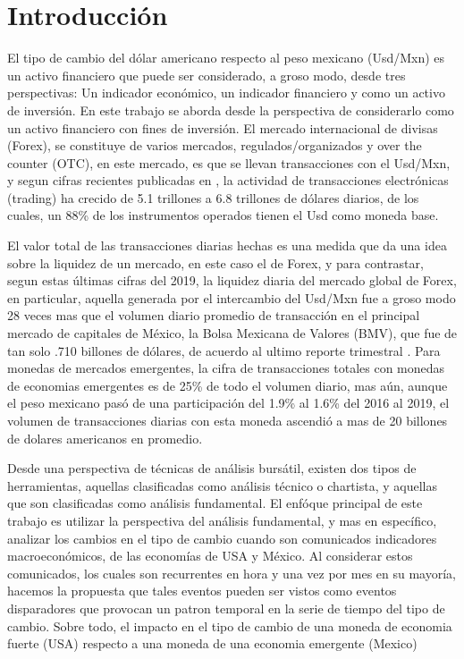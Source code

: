 \documentclass{article}\usepackage[]{graphicx}\usepackage[]{color}
\begin{document}
\section{Introducci\'on}
\label{sec_intro}

El tipo de cambio del d\'olar americano respecto al peso mexicano (Usd/Mxn) es un activo financiero que
puede ser considerado, a groso modo, desde tres perspectivas: Un indicador econ\'omico, un indicador
financiero y como un activo de inversi\'on. En este trabajo se aborda desde la perspectiva de considerarlo
como un activo financiero con fines de inversi\'on. El mercado internacional de divisas (Forex),
se constituye de varios mercados, regulados/organizados y over the counter (OTC), en este mercado, es que
se llevan transacciones con el Usd/Mxn, y segun cifras recientes publicadas en \cite{BIS2019}, la actividad
de transacciones electr\'onicas (trading) ha crecido de 5.1 trillones a 6.8 trillones de d\'olares diarios,
de los cuales, un 88\% de los instrumentos operados tienen el Usd como moneda base.

El valor total de las transacciones diarias hechas es una medida
que da una idea sobre la liquidez de un mercado, en este caso el de Forex, y para contrastar,
segun estas \'ultimas cifras del 2019, la liquidez diaria del mercado global de Forex, en particular,
aquella generada por el intercambio del Usd/Mxn fue a groso modo 28 veces mas que el volumen diario
promedio de transacci\'on en el principal mercado de capitales de M\'exico, la Bolsa Mexicana de Valores
(BMV), que fue de tan solo .710 billones de d\'olares, de acuerdo al ultimo reporte trimestral \cite{BMV2019}.
Para monedas de mercados emergentes, la cifra de transacciones totales con monedas de economias emergentes
es de 25\% de todo el volumen diario, mas a\'un, aunque el peso mexicano pas\'o de una participaci\'on del
1.9\% al 1.6\% del 2016 al 2019, el volumen de transacciones diarias con esta moneda ascendi\'o a mas de 20
billones de dolares americanos en promedio.

Desde una perspectiva de t\'ecnicas de an\'alisis burs\'atil, existen dos tipos de herramientas, aquellas
clasificadas como an\'alisis t\'ecnico o chartista, y aquellas que son clasificadas como an\'alisis
fundamental. El enf\'oque principal de este trabajo es utilizar la perspectiva del an\'alisis fundamental, y
mas en espec\'ifico, analizar los cambios en el tipo de cambio cuando son comunicados indicadores
macroecon\'omicos, de las econom\'ias de USA y M\'exico. Al considerar estos comunicados, los cuales son
recurrentes en hora y una vez por mes en su mayor\'ia, hacemos la propuesta que tales eventos pueden
ser vistos como eventos disparadores que provocan un patron temporal en la serie de tiempo del tipo de cambio.
Sobre todo, el impacto en el tipo de cambio de una moneda de economia fuerte (USA) respecto a una moneda
de una economia emergente (Mexico)
\end{document}
